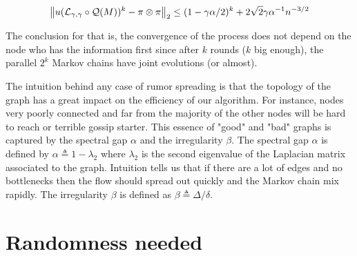 \documentclass[10pt,journal,a4paper]{IEEEtran}
\begin{document}
\[
  \left\lVert u(\mathcal L_{\gamma,\gamma} \circ \mathcal Q(M))^k - \pi \otimes \pi\right\rVert_2 \leq (1 - \gamma \alpha / 2)^k + 2 \sqrt 2 \gamma \alpha^{-1} n^{-3/2}
\]

The conclusion for that is, the convergence of the process does not depend on the node who has the information first since after $k$ rounds ($k$ big enough), the parallel $2^k$ Markov chains have joint evolutions (or almost).

The intuition behind any case of rumor spreading is that the topology of the graph has a great impact on the efficiency of our algorithm. For instance, nodes very poorly connected and far from the majority of the other nodes will be hard to reach or terrible gossip starter. This essence of "good" and "bad" graphs is captured by the spectral gap $\alpha$ and the irregularity $\beta$. The spectral gap $\alpha$ is defined by $\alpha \triangleq 1 - \lambda_2$ where $\lambda_2$ is the second eigenvalue of the Laplacian matrix associated to the graph. 
Intuition tells us that if there are a lot of edges and no bottlenecks then the flow should spread out quickly and the Markov chain mix rapidly. The irregularity $\beta$ is defined as $\beta \triangleq \Delta/\delta$.

\section{Randomness needed}


\end{document}
